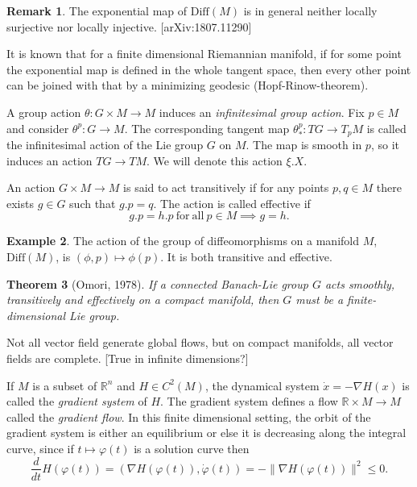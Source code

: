 \documentclass{article}
\theoremstyle{plain}
\newtheorem{teo}{Theorem}[section]
\theoremstyle{definition}
\newtheorem{oss}[teo]{Remark}
\newtheorem{exam}[teo]{Example}
\numberwithin{equation}{section}
\newcommand{\R}{\ensuremath{\mathbb{R}}}
\newcommand{\Diff}{\ensuremath{\mathrm{Diff}}}
\begin{document}
\begin{oss}
	The exponential map of $\Diff(M)$ is in general neither locally surjective nor locally injective. [arXiv:1807.11290]
\end{oss}

It is known that for a finite dimensional Riemannian manifold, if for some point the exponential map is defined in the whole tangent space, then every other point can be joined with that by a minimizing geodesic (Hopf-Rinow-theorem).

A group action $\theta:G\times M\to M$ induces an \textit{infinitesimal group action}. Fix $p\in M$ and consider $\theta^p:G\to M$. The corresponding tangent map $\theta^p_*:TG\to T_pM$ is called the infinitesimal action of the Lie group $G$ on $M$. The map is smooth in $p$, so it induces an action $TG\to TM$. We will denote this action $\xi.X$. 

An action $G\times M\to M$ is said to act transitively if for any points $p,q\in M$ there exists $g\in G$ such that $g.p=q$. The action is called effective if
\[
g.p=h.p\ \mathrm{for}\ \mathrm{all}\ p\in M \implies g=h.
\]

\begin{exam}
	The action of the group of diffeomorphisms on a manifold $M$, $\Diff(M)$, is $(\phi,p)\mapsto \phi(p)$. It is both transitive and effective.
\end{exam}

\begin{teo}[Omori, 1978]
	If a connected Banach-Lie group $G$ acts smoothly, transitively and effectively on a compact manifold, then $G$ must be a finite-dimensional Lie group.
\end{teo}

Not all vector field generate global flows, but on compact manifolds, all vector fields are complete. [True in infinite dimensions?]

If $M$ is a subset of $\R^n$ and $H\in C^2(M)$, the dynamical system $\dot{x}=-\nabla H(x)$ is called the \textit{gradient system} of $H$. The gradient system defines a flow $\R\times M\to M$ called the \textit{gradient flow}. In this finite dimensional setting, the orbit of the gradient system is either an equilibrium or else it is decreasing along the integral curve, since if $t\mapsto \varphi(t)$ is a solution curve then
\[
\frac{d}{dt}H(\varphi(t))=(\nabla H(\varphi(t)),\dot{\varphi}(t))=-\|\nabla H(\varphi(t))\|^2\leq 0.
\]
\end{document}
